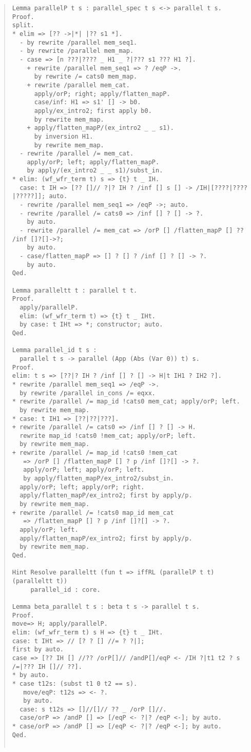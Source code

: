 \documentclass[12pt, titlepage]{ltjsarticle}
\begin{document}
\begin{quote}
\begin{verbatim}
Lemma parallelP t s : parallel_spec t s <-> parallel t s.
Proof.
split.
* elim => [?? ->|*| |?? s1 *].
  - by rewrite /parallel mem_seq1.
  - by rewrite /parallel mem_map.
  - case => [n ???|???? _ H1 _ ?|??? s1 ??? H1 ?].
    + rewrite /parallel mem_seq1 => ? /eqP ->.
      by rewrite /= cats0 mem_map.
    + rewrite /parallel mem_cat.
      apply/orP; right; apply/flatten_mapP.
      case/inf: H1 => s1' [] -> b0.
      apply/ex_intro2; first apply b0.
      by rewrite mem_map.
    + apply/flatten_mapP/(ex_intro2 _ _ s1).
      by inversion H1.
      by rewrite mem_map.
  - rewrite /parallel /= mem_cat.
    apply/orP; left; apply/flatten_mapP.
    by apply/(ex_intro2 _ _ s1)/subst_in.
* elim: (wf_wfr_term t) s => {t} t _ IH.
  case: t IH => [?? []// ?|? IH ? /inf [] s [] -> /IH|[????|????|?????]]; auto.
  - rewrite /parallel mem_seq1 => /eqP ->; auto.
  - rewrite /parallel /= cats0 => /inf [] ? [] -> ?.
    by auto.
  - rewrite /parallel /= mem_cat => /orP [] /flatten_mapP [] ?? /inf []?[]->?;
    by auto.
  - case/flatten_mapP => [] ? [] ? /inf [] ? [] -> ?.
    by auto.
Qed.

Lemma paralleltt t : parallel t t.
Proof.
  apply/parallelP.
  elim: (wf_wfr_term t) => {t} t _ IHt.
  by case: t IHt => *; constructor; auto.
Qed.

Lemma parallel_id t s :
  parallel t s -> parallel (App (Abs (Var 0)) t) s.
Proof.
elim: t s => [??|? IH ? /inf [] ? [] -> H|t IH1 ? IH2 ?].
* rewrite /parallel mem_seq1 => /eqP ->.
  by rewrite /parallel in_cons /= eqxx.
* rewrite /parallel /= map_id !cats0 mem_cat; apply/orP; left.
  by rewrite mem_map.
* case: t IH1 => [??|??|???].
+ rewrite /parallel /= cats0 => /inf [] ? [] -> H.
  rewrite map_id !cats0 !mem_cat; apply/orP; left.
  by rewrite mem_map.
+ rewrite /parallel /= map_id !cats0 !mem_cat
   => /orP [] /flatten_mapP [] ? p /inf []?[] -> ?.
   apply/orP; left; apply/orP; left.
   by apply/flatten_mapP/ex_intro2/subst_in.
  apply/orP; left; apply/orP; right.
  apply/flatten_mapP/ex_intro2; first by apply/p.
  by rewrite mem_map.
+ rewrite /parallel /= !cats0 map_id mem_cat
   => /flatten_mapP [] ? p /inf []?[] -> ?.
  apply/orP; left.
  apply/flatten_mapP/ex_intro2; first by apply/p.
  by rewrite mem_map.
Qed.

Hint Resolve paralleltt (fun t => iffRL (parallelP t t) (paralleltt t))
     parallel_id : core.

Lemma beta_parallel t s : beta t s -> parallel t s.
Proof.
move=> H; apply/parallelP.
elim: (wf_wfr_term t) s H => {t} t _ IHt.
case: t IHt => // [? ? [] //= ? ?|];
first by auto.
case => [?? IH [] //?? /orP[]// /andP[]/eqP <- /IH ?|t1 t2 ? s /=|??? IH []// ??].
* by auto.
* case t12s: (subst t1 0 t2 == s).
   move/eqP: t12s => <- ?.
   by auto.
  case: s t12s => []//[]// ?? _ /orP []//.
  case/orP => /andP [] => [/eqP <- ?|? /eqP <-]; by auto.
* case/orP => /andP [] => [/eqP <- ?|? /eqP <-]; by auto.
Qed.


\end{verbatim}
\end{quote}
\end{document}
